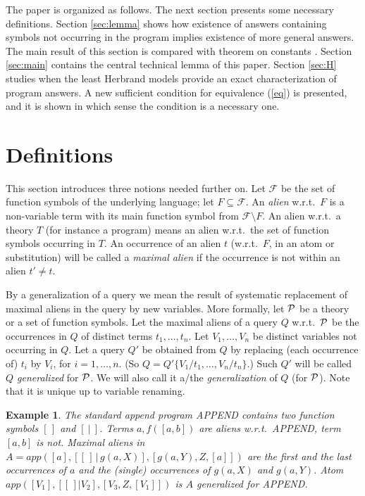 \documentclass[a4paper]{tlp2}
\newtheorem{example}[theorem]{Example}
\newcommand*{\seq}[2][n]  {{#2_{1}, \allowbreak \ldots, \allowbreak #2_{#1}}}
\newcommand*{\F}{{\ensuremath{\mathscr F}}\xspace}
\renewcommand*{\P}{{\ensuremath{\cal P}}\xspace}
\begin{document}
The paper is organized as follows.  The next section presents some 
necessary definitions.
Section \ref{sec:lemma} 
shows how existence of answers containing symbols not occurring in the program
implies existence of more general answers.  The main result of this section
is compared with theorem on constants \cite{shoenfield67}.
Section \ref{sec:main}
contains the central technical lemma of this paper.
Section \ref{sec:H}
studies when the least Herbrand models provide an exact characterization of
program answers.  A new sufficient condition for equivalence
(\ref{eq}) is presented, and it is shown in which sense the condition is a
necessary one.





\section{Definitions}



This section introduces three notions needed further on.
Let $\F$ be the set of function symbols of the underlying language;
let $F\subseteq \F$.  An {\em alien} w.r.t.\ $F$  
is a non-variable term with its main function symbol from $\F\setminus F$.
An alien w.r.t.\ a theory $T$ (for instance a program)
means an alien w.r.t.\ the set of function symbols occurring in $T$.
An occurrence of an alien $t$ (w.r.t.\ $F$, in an atom or substitution)
will be called a {\em maximal alien} if the occurrence is not within
an alien $t'\neq t$.



By a generalization of a query we mean the result of systematic replacement
of maximal aliens in the query by new variables.  More formally, 
let \P be a theory or a set of function symbols.
Let the maximal aliens of a query $Q$ w.r.t.\ $\P$
be the occurrences in $Q$ of distinct terms $\seq t$.
Let $\seq V$ be distinct variables not occurring in $Q$.
Let a query $Q'$ be
obtained from $Q$ by replacing (each occurrence of) 
$t_i$ by $V_i$, for $i=1,\ldots,n$.  
(So $Q=Q'\{V_1/t_1,\ldots,V_n/t_n\}$.)
Such $Q'$ will be called
{\em $Q$ generalized} for $\P$.
We will also call it a/the {\em generalization} of $Q$ (for \P).
Note that it is unique up to variable renaming. 

\begin{example}
The standard append program APPEND \cite[p.\,127]{Apt-Prolog}
contains two function symbols  $[\,]$ and $[\ |\ ]$.
Terms $a,f([a,b])$ are aliens w.r.t.\ APPEND, term $[a,b]$ is not.
Maximal aliens in $A = app( [a], [[\,]\,|\,g(a,X)], [g(a,Y),Z,[a]] )$
are the first and the last occurrences of $a$ and the (single) occurrences of
 $g(a,X)$ and $g(a,Y)$.
Atom $app( [V_1], [[\,]|V_2], [V_3,Z,[V_1]] )$
is $A$ generalized for APPEND.
\end{example}
\end{document}

